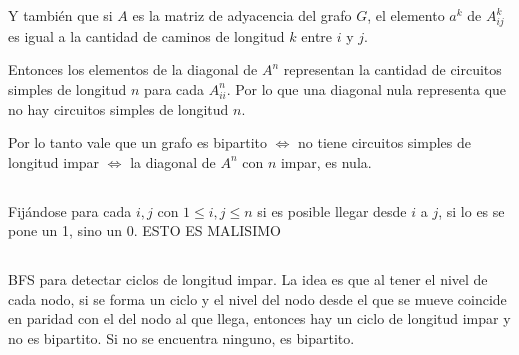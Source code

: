 Y también que si $A$ es la matriz de adyacencia del grafo $G$, el elemento $a^k$ de $A^k_{ij}$
es igual a la cantidad de caminos de longitud $k$ entre $i$ y $j$.

Entonces los elementos de la diagonal de $A^n$ representan la cantidad de circuitos simples de longitud $n$ para cada $A^n_{ii}$. Por lo que una diagonal nula representa que no hay circuitos simples de longitud $n$.

Por lo tanto vale que un grafo es bipartito $\Longleftrightarrow$ no tiene circuitos simples de longitud impar $\Longleftrightarrow$ la diagonal de $A^n$ con $n$ impar, es nula.

\subsection{}
Fijándose para cada $i, j$ con $1 \leq i, j \leq n$ si es posible llegar desde $i$ a $j$, si lo es se pone un 1, sino un 0. ESTO ES MALISIMO

\subsection{}
\subsubsection{}
BFS para detectar ciclos de longitud impar. La idea es que al tener el nivel de cada nodo, si se forma un ciclo y el nivel del nodo desde el que se mueve coincide en paridad con el del nodo al que llega, entonces hay un ciclo de longitud impar y no es bipartito. Si no se encuentra ninguno, es bipartito.

